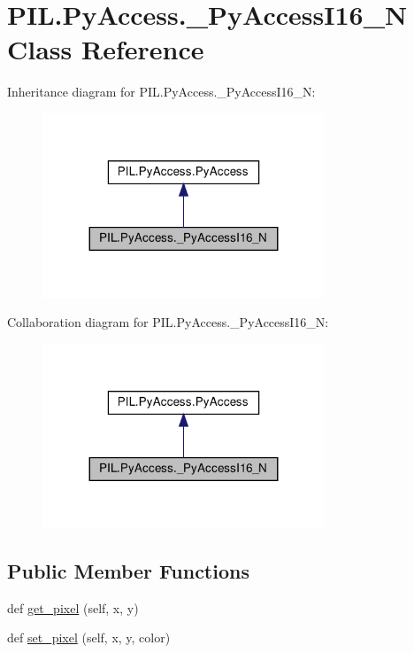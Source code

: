 \hypertarget{classPIL_1_1PyAccess_1_1__PyAccessI16__N}{}\section{P\+I\+L.\+Py\+Access.\+\_\+\+Py\+Access\+I16\+\_\+N Class Reference}
\label{classPIL_1_1PyAccess_1_1__PyAccessI16__N}


Inheritance diagram for P\+I\+L.\+Py\+Access.\+\_\+\+Py\+Access\+I16\+\_\+N\+:
\nopagebreak
\begin{figure}[H]
\begin{center}
\leavevmode
\includegraphics[width=239pt]{classPIL_1_1PyAccess_1_1__PyAccessI16__N__inherit__graph}
\end{center}
\end{figure}


Collaboration diagram for P\+I\+L.\+Py\+Access.\+\_\+\+Py\+Access\+I16\+\_\+N\+:
\nopagebreak
\begin{figure}[H]
\begin{center}
\leavevmode
\includegraphics[width=239pt]{classPIL_1_1PyAccess_1_1__PyAccessI16__N__coll__graph}
\end{center}
\end{figure}
\subsection*{Public Member Functions}
\begin{DoxyCompactItemize}
\item 
def \hyperlink{classPIL_1_1PyAccess_1_1__PyAccessI16__N_aeda075f8caddd1374f88bdb26aeeed9a}{get\+\_\+pixel} (self, x, y)
\item 
def \hyperlink{classPIL_1_1PyAccess_1_1__PyAccessI16__N_adf71bf0b1833645b4060c184f82a8141}{set\+\_\+pixel} (self, x, y, color)
\end{DoxyCompactItemize}
